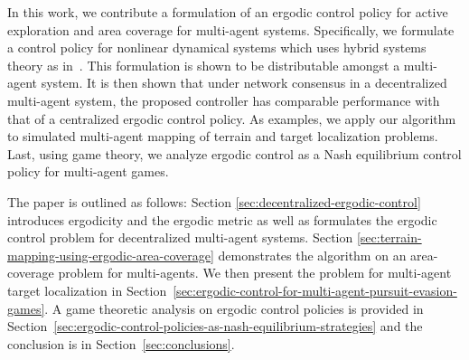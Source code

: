 \documentclass[letterpaper, 10 pt, conference]{ieeeconf}  %
\begin{document}


In this work, we contribute a formulation of an ergodic control policy for active exploration and area coverage for multi-agent systems. 
Specifically, we formulate a control policy for nonlinear dynamical systems which uses hybrid systems theory as in~\cite{mavrommatiTRO2017realTime, ansari2016sequential}. 
This formulation is shown to be distributable amongst a multi-agent system.
It is then shown that under network consensus in a decentralized multi-agent system, the proposed controller has comparable performance with that of a centralized ergodic control policy.
As examples, we apply our algorithm to simulated multi-agent mapping of terrain and target localization problems.
Last, using game theory, we analyze ergodic control as a Nash equilibrium control policy for multi-agent games.

The paper is outlined as follows: Section \ref{sec:decentralized-ergodic-control} introduces ergodicity and the ergodic metric as well as formulates the ergodic control problem for decentralized multi-agent systems. 
Section \ref{sec:terrain-mapping-using-ergodic-area-coverage} demonstrates the algorithm on an area-coverage problem for multi-agents. 
We then present the problem for multi-agent target localization in Section~\ref{sec:ergodic-control-for-multi-agent-pursuit-evasion-games}.
A game theoretic analysis on ergodic control policies is provided in Section~\ref{sec:ergodic-control-policies-as-nash-equilibrium-strategies} and the conclusion is in Section~\ref{sec:conclusions}.
\end{document}
